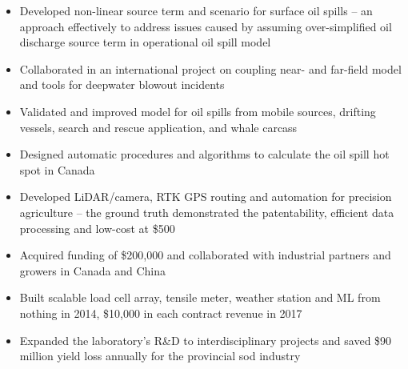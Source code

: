 \documentclass[10pt,a4paper,ragged2e,withhyper]{altacv}
\begin{document}
\begin{paracol}{2}

\begin{itemize}
\item Developed non-linear source term and scenario for surface oil spills -- an approach effectively to address issues caused by assuming over-simplified oil discharge source term in operational oil spill model
\item Collaborated in an international project on coupling near- and far-field model and tools for deepwater blowout incidents
\item Validated and improved model for oil spills from mobile sources, drifting vessels, search and rescue application, and whale carcass
\item Designed automatic procedures and algorithms to calculate the oil spill hot spot in Canada
\end{itemize}

\divider

\begin{itemize}
\item Developed LiDAR/camera, RTK GPS routing and automation for precision agriculture -- the ground truth demonstrated the patentability, efficient data processing and low-cost at \$500
\item Acquired funding of \$200,000 and collaborated with industrial partners and growers in Canada and China
\item Built scalable load cell array, tensile meter, weather station and ML from nothing in 2014, \$10,000 in each contract revenue in 2017
\item Expanded the laboratory's R\&D to interdisciplinary projects and saved \$90 million yield loss annually for the provincial sod industry
\end{itemize}

\divider


\end{paracol}
\end{document}
